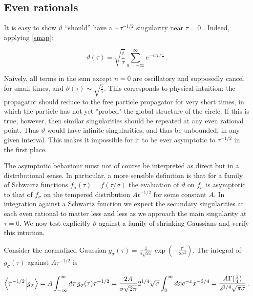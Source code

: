 \documentclass{article}
\newcommand{\T}{\ensuremath{\vartheta}}
\newcommand{\intR}{\int_{-\infty}^\infty}
\newcommand{\sumZ}{\sum_{n=-\infty}^{\infty}}
\begin{document}
\subsection{Even rationals}\label{sec:evens}

It is easy to show $\T$ ``should'' have a $\sim \tau^{-1/2}$ singularity near $\tau = 0$ \cite{boxpdf}. Indeed, applying  \eqref{smap}:

\begin{equation}
    \vartheta(\tau) = \sqrt{\frac{i}{\tau}} \sumZ e^{-i\pi n^2 \frac{1}{\tau}}\,.
\end{equation}

Naively, all terms in the sum except $n=0$ are oscillatory and supposedly cancel for small times, and $\vartheta(\tau) \sim \sqrt{\frac{i}{\tau}}$. This corresponds to physical intuition: the propagator should reduce to the free particle propagator for very short times, in which the particle has not yet "probed" the global structure of the circle. If this is true, however, then similar singularities should be repeated at any even rational point. Thus $\T$ would have infinite singularities, and thus be unbounded, in any given interval. This makes it impossible for it to be ever asymptotic to $\tau^{-1/2}$ in the first place.

The asymptotic behaviour must not of course be interpreted as direct but in a distributional sense. In particular, a more sensible definition is that for a family of Schwartz functions $f_\sigma(\tau) = f(\tau/\sigma)$ the evaluation of $\vartheta$ on $f_\sigma$ is asymptotic to that of $f_\sigma$ on the tempered distribution $A t^{-1/2}$ for some constant $A$. In integration against a Schwartz function we expect the secundary singularities at each even rational to matter less and less as we approach the main singularity at $\tau = 0$. We now test explicitly $\vartheta$ against a family of shrinking Gaussians and verify this intuition.

Consider the normalized Gaussian $g_\sigma(\tau) = \frac{1}{\sigma \sqrt{2\pi}} \exp(-\frac{\tau^2}{2\sigma^2})$. The integral of $g_\sigma(\tau)$ against $A \tau^{-1/2}$ is

\begin{equation}
    \bra{\tau^{-1/2}}\ket{g_\sigma} =  A \intR d\tau \, g_\sigma(\tau) \tau^{-1/2} = \frac{2A}{\sigma\sqrt{2\pi}} 2^{1/4} \sqrt\sigma \int_0^\infty dx e^{-x} x^{-3/4} = \frac{A\Gamma(\frac{1}{4})}{2^{1/4}\sqrt{\pi\sigma}}\,.
\end{equation}
\end{document}
